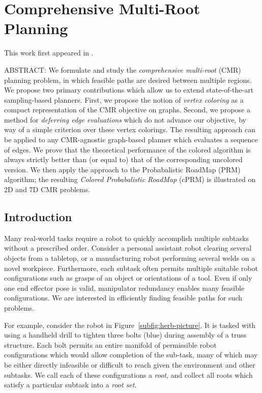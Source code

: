 \chapter{Comprehensive Multi-Root Planning}
\label{chap:cmr}

This work first appeared in
\cite{dellin2015cmr}.

ABSTRACT:
We formulate and study the
\emph{comprehensive multi-root} (CMR) planning problem,
in which feasible paths are desired between multiple regions.
We propose two primary contributions which allow us to extend
state-of-the-art sampling-based planners.
First, we propose the notion of \emph{vertex coloring} as a compact
representation of the CMR objective on graphs.
Second, we propose a method for \emph{deferring edge evaluations}
which do not advance our objective, by way of a simple
criterion over these vertex colorings.
The resulting approach can be applied to any CMR-agnostic 
graph-based planner which evaluates a sequence of edges.
We prove that the theoretical performance of the colored algorithm
is always strictly better than (or equal to)
that of the corresponding uncolored version.
We then apply the approach to the Probabalistic RoadMap (PRM)
algorithm;
the resulting \emph{Colored Probabalistic RoadMap} (cPRM)
is illustrated on 2D and 7D CMR problems.

\section{Introduction}
\label{sec:intro}

Many real-world tasks require a robot to quickly accomplish multiple
subtasks without a prescribed order.
Consider a personal assistant robot
clearing several objects from a tabletop,
or a manufacturing robot performing several welds on a novel workpiece.
Furthermore,
each subtask often permits multiple suitable robot configurations such as
grasps of an object or orientations of a tool.
Even if only one end effector pose is valid,
manipulator redundancy enables many feasible configurations. 
We are interested in efficiently finding feasible paths
for such problems.

For example, consider the robot in Figure~\ref{subfig:herb-picture}.
It is tasked with using a handheld drill to tighten three bolts (blue)
during assembly of a truss structure.
Each bolt permits an entire manifold of permissible robot
configurations which would allow completion of the sub-task,
many of which may be either directly infeasible or difficult to reach
given the environment and other subtasks. We call each of these configurations 
a \emph{root}, and collect all roots which satisfy a particular subtask
into a \emph{root set}. 

